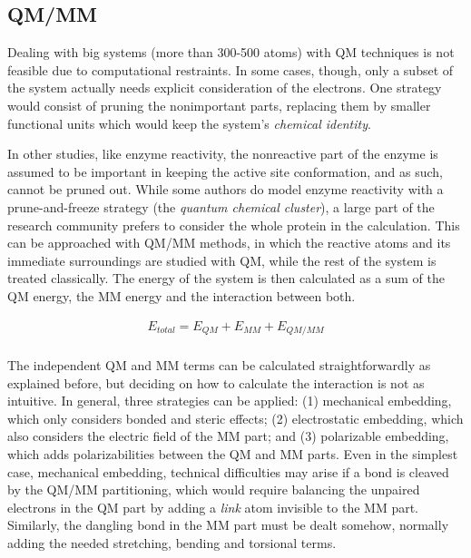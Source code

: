 \subsection{QM/MM}
\label{section:qmmm}

Dealing with big systems (more than 300-500 atoms) with QM techniques is not feasible due to computational restraints. In some cases, though, only a subset of the system actually needs explicit consideration of the electrons. One strategy would consist of pruning the nonimportant parts, replacing them by smaller functional units which would keep the system's \textit{chemical identity}.

In other studies, like enzyme reactivity, the nonreactive part of the enzyme is assumed to be important in keeping the active site conformation, and as such, cannot be pruned out. While some authors do model enzyme reactivity with a prune-and-freeze strategy (the \textit{quantum chemical cluster}\cite{siegbahn2009recent}), a large part of the research community prefers to consider the whole protein in the calculation. This can be approached with QM/MM methods, in which the reactive atoms and its immediate surroundings are studied with QM, while the rest of the system is treated classically. The energy of the system is then calculated as a sum of the QM energy, the MM energy and the interaction between both.


\begin{align}
	E_{total}=E_{QM}+E_{MM}+E_{QM/MM} \\ \tag{QM/MM energy}
\end{align}


The independent QM and MM terms can be calculated straightforwardly as explained before, but deciding on how to calculate the interaction is not as intuitive. In general, three strategies can be applied: (1) mechanical embedding, which only considers bonded and steric effects; (2) electrostatic embedding, which also considers the electric field of the MM part; and (3) polarizable embedding, which adds polarizabilities between the QM and MM parts. Even in the simplest case, mechanical embedding, technical difficulties may arise if a bond is cleaved by the QM/MM partitioning, which would require balancing the unpaired electrons in the QM part by adding a \textit{link} atom invisible to the MM part. Similarly, the dangling bond in the MM part must be dealt somehow, normally adding the needed stretching, bending and torsional terms.

